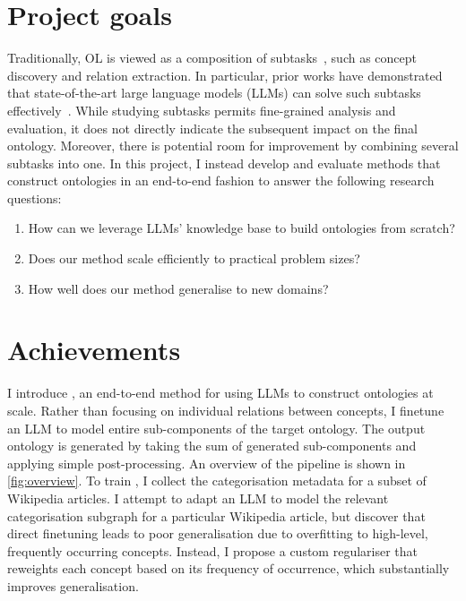\section{Project goals}

Traditionally, OL is viewed as a composition of subtasks~\cite{asim2018survey}, such as concept discovery and relation extraction. In particular, prior works have demonstrated that state-of-the-art large language models (LLMs) can solve such subtasks effectively~\cite{babaei2023llms4ol}. While studying subtasks permits fine-grained analysis and evaluation, it does not directly indicate the subsequent impact on the final ontology. Moreover, there is potential room for improvement by combining several subtasks into one. In this project, I instead develop and evaluate methods that construct ontologies in an end-to-end fashion to answer the following research questions:
\begin{enumerate}
    \item How can we leverage LLMs' knowledge base to build ontologies from scratch?
    \item Does our method scale efficiently to practical problem sizes?
    \item How well does our method generalise to new domains?
\end{enumerate}

\section{Achievements}



I introduce \name, an end-to-end method for using LLMs to construct ontologies at scale. Rather than focusing on individual relations between concepts, I finetune an LLM to model entire sub-components of the target ontology. The output ontology is generated by taking the sum of generated sub-components and applying simple post-processing. An overview of the pipeline is shown in \cref{fig:overview}. To train \name, I collect the categorisation metadata for a subset of Wikipedia articles. I attempt to adapt an LLM to model the relevant categorisation subgraph for a particular Wikipedia article, but discover that direct finetuning leads to poor generalisation due to overfitting to high-level, frequently occurring concepts. Instead, I propose a custom regulariser that reweights each concept based on its frequency of occurrence, which substantially improves generalisation.

